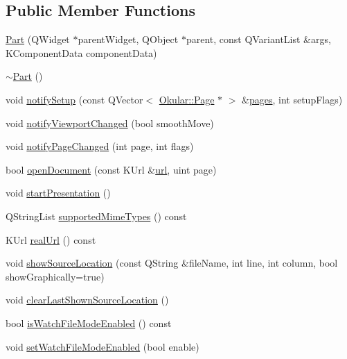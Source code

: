 \subsection*{Public Member Functions}
\begin{DoxyCompactItemize}
\item 
\hyperlink{classOkular_1_1Part_a115b54a5c8d60560adddba594a8a25c5}{Part} (Q\+Widget $\ast$parent\+Widget, Q\+Object $\ast$parent, const Q\+Variant\+List \&args, K\+Component\+Data component\+Data)
\item 
\hyperlink{classOkular_1_1Part_ad9e36566a956f331bbc7c59a43613481}{$\sim$\+Part} ()
\item 
void \hyperlink{classOkular_1_1Part_ab6152ff38313bb1307fd684f56413f93}{notify\+Setup} (const Q\+Vector$<$ \hyperlink{classOkular_1_1Page}{Okular\+::\+Page} $\ast$ $>$ \&\hyperlink{classOkular_1_1Part_a91ab48c6ac9ee0edb1eac524e141e54b}{pages}, int setup\+Flags)
\item 
void \hyperlink{classOkular_1_1Part_a213859eeacf03d50930622c5e7814370}{notify\+Viewport\+Changed} (bool smooth\+Move)
\item 
void \hyperlink{classOkular_1_1Part_a255ab099246f141150600299ec2c3228}{notify\+Page\+Changed} (int page, int flags)
\item 
bool \hyperlink{classOkular_1_1Part_a0c63d423f5922f5272ff1131b8264050}{open\+Document} (const K\+Url \&\hyperlink{classKParts_1_1ReadOnlyPart_a5b8edbf05a338814287496882adde559}{url}, uint page)
\item 
void \hyperlink{classOkular_1_1Part_ae7d1a0cd6debe40d4280872482732e3c}{start\+Presentation} ()
\item 
Q\+String\+List \hyperlink{classOkular_1_1Part_a32fe7199433b464ea89346c3b95e5824}{supported\+Mime\+Types} () const 
\item 
K\+Url \hyperlink{classOkular_1_1Part_a2b2ada2c0d6c28564510d4116a9b6d28}{real\+Url} () const 
\item 
void \hyperlink{classOkular_1_1Part_a73f761d81f8fc5551055b3f5ff27b054}{show\+Source\+Location} (const Q\+String \&file\+Name, int line, int column, bool show\+Graphically=true)
\item 
void \hyperlink{classOkular_1_1Part_a52946f7b6c892cf4261f6766aa14bc04}{clear\+Last\+Shown\+Source\+Location} ()
\item 
bool \hyperlink{classOkular_1_1Part_ac72fd2bcca95a85ede8729c63b40982f}{is\+Watch\+File\+Mode\+Enabled} () const 
\item 
void \hyperlink{classOkular_1_1Part_adfe803c7fe2cbfb95683117307840918}{set\+Watch\+File\+Mode\+Enabled} (bool enable)

\end{DoxyCompactItemize}
